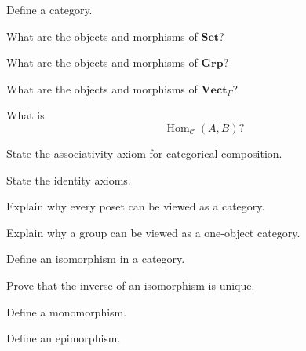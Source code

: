 \begin{exercise}[1]
Define a category.
\end{exercise}

\begin{exercise}[1]
What are the objects and morphisms of \(\mathbf{Set}\)?
\end{exercise}

\begin{exercise}[1]
What are the objects and morphisms of \(\mathbf{Grp}\)?
\end{exercise}

\begin{exercise}[1]
What are the objects and morphisms of \(\mathbf{Vect}_F\)?
\end{exercise}

\begin{exercise}[1]
What is
\[ \operatorname{Hom}_{\mathcal C}(A,B)? \]
\end{exercise}

\begin{exercise}[1]
State the associativity axiom for categorical composition.
\end{exercise}

\begin{exercise}[1]
State the identity axioms.
\end{exercise}

\begin{exercise}[2]
Explain why every poset can be viewed as a category.
\end{exercise}

\begin{exercise}[2]
Explain why a group can be viewed as a one-object category.
\end{exercise}

\begin{exercise}[1]
Define an isomorphism in a category.
\end{exercise}

\begin{exercise}[2]
Prove that the inverse of an isomorphism is unique.
\end{exercise}

\begin{exercise}[1]
Define a monomorphism.
\end{exercise}

\begin{exercise}[1]
Define an epimorphism.
\end{exercise}

